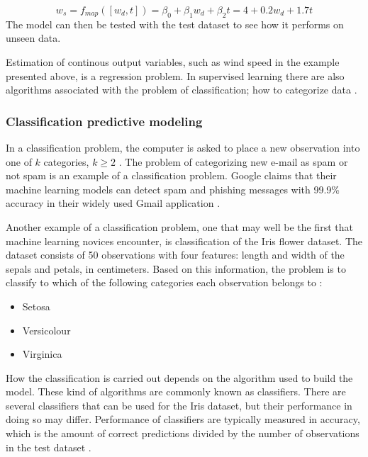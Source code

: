 \begin{equation} \label{eq:example_ws}
	w_s = f_{map}([w_d, t]) = \beta_0 + \beta_1 w_d + \beta_2 t = 4 + 0.2w_d + 1.7t
\end{equation}
	The model can then be tested with the test dataset to see how it performs on unseen data.


	Estimation of continous output variables, such as wind speed in the example presented above, is a regression problem. In supervised learning there are also algorithms associated with the problem of classification; how to categorize data \cite{WEBSITE:8}.


\subsubsection{Classification predictive modeling}
	In a classification problem, the computer is asked to place a new observation into one of $k$ categories, $k \geq 2$ \cite{BOOK:1}. The problem of categorizing new e-mail as spam or not spam is an example of a classification problem. Google claims that their machine learning models can detect spam and phishing messages with 99.9\% accuracy in their widely used Gmail application \cite{WEBSITE:4}. 

	Another example of a classification problem, one that may well be the first that machine learning novices encounter, is classification of the Iris flower dataset. The dataset consists of 50 observations with four features: length and width of the sepals and petals, in centimeters. Based on this information, the problem is to classify to which of the following categories each observation belongs to \cite{WEBSITE:5}:

\begin{itemize}
	\item Setosa
	\item Versicolour
	\item Virginica
\end{itemize}

	How the classification is carried out depends on the algorithm used to build the model. These kind of algorithms are commonly known as classifiers. There are several classifiers that can be used for the Iris dataset, but their performance in doing so may differ. Performance of classifiers are typically measured in accuracy, which is the amount of correct predictions divided by the number of observations in the test dataset \cite{BOOK:1}.

